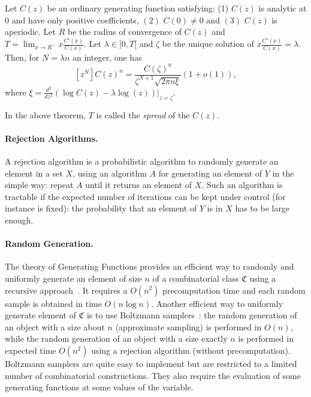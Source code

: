 \begin{theorem}\label{thm:VIII.8}
Let $C(z)$ be an ordinary generating function satisfying: (1) $C(z)$ is
analytic at $0$ and have only positive coefficients, $(2)$ $C(0)\neq 0$ and
$(3)$ $C(z)$ is aperiodic. Let $R$ be the radius of convergence of $C(z)$
and $T=\lim_{x\to R^{-}} x\frac{C'(x)}{C(x)}$.
Let $\lambda\in ]0,T[$ and $\zeta$ be the  unique
solution of $x\frac{C'(x)}{C(x)}=\lambda$. Then, for $N=\lambda n$ an
integer, one has
$$[z^N]C(z)^n=\frac{C(\zeta)^n}{\zeta^{N+1}\sqrt{2\pi n\xi}}(1+o(1)),$$
where $\xi=\frac{d^2}{d z^2}\left(\log C(z)-\lambda\log (z)\right)|_{z=\zeta}.$
\end{theorem}
In the above theorem, $T$ is called the \textit{spread} of the $C(z)$. 

\paragraph{Rejection Algorithms.}
A rejection algorithm is a probabilistic algorithm to randomly
generate an element in a set $X$, using an algorithm $A$ for
generating an element of $Y$ in the simple way: repeat $A$ until it
returns an element of $X$. Such an algorithm is tractable if the
expected number of iterations can be kept under control (for instance is
fixed): the probability that an element of $Y$ is in $X$ has to be large
enough.

\paragraph{Random Generation.}
 The theory of Generating Functions provides an efficient way to randomly
 and uniformly generate an element of size $n$ of a combinatorial class
 $\mathfrak{C}$ using a recursive approach~\cite{FSbook}. It requires a
 $O(n^2)$ precomputation time and each random sample is obtained in time
 $O(n\log n)$. Another efficient way to uniformly generate element of
 $\mathfrak{C}$ is to use Boltzmann
 samplers~\cite{DBLP:journals/cpc/DuchonFLS04}: the random generation of an
 object with a size about $n$ (approximate sampling) is performed in $O(n)$,
 while the random generation of an object with a size exactly $n$ is
 performed in expected time $O(n^2)$ using a rejection algorithm (without
 precomputation). Boltzmann samplers are quite easy to implement but are
 restricted to a limited number of combinatorial constructions. They also
 require the evaluation of some generating functions at some values of the
 variable.



